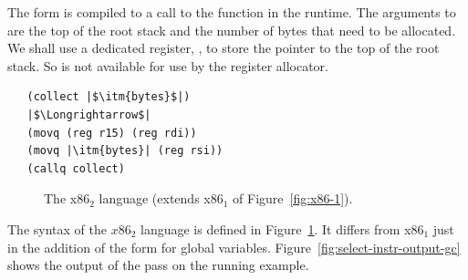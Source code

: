 \documentclass[11pt]{book}
\newcommand{\gray}[1]{{\color{gray} #1}}
\begin{document}
The  form is compiled to a call to the 
function in the runtime. The arguments to  are the top
of the root stack and the number of bytes that need to be allocated.
We shall use a dedicated register, , to store the pointer to
the top of the root stack. So  is not available for use by
the register allocator.
\begin{lstlisting}
   (collect |$\itm{bytes}$|)
   |$\Longrightarrow$|
   (movq (reg r15) (reg rdi))
   (movq |\itm{bytes}| (reg rsi))
   (callq collect)
\end{lstlisting}


\begin{figure}[tp]
\fbox{
\begin{minipage}{0.96\textwidth}
\[
\begin{array}{lcl}
\Arg &::=&  \gray{  \INT{\Int} \mid \REG{\Reg}
    \mid (\key{deref}\,\Reg\,\Int) } \\
   &\mid& \gray{ (\key{byte-reg}\; \Reg)  }
   \mid (\key{global-value}\; \itm{name}) \\
\itm{cc} & ::= & \gray{  \key{e} \mid \key{l} \mid \key{le} \mid \key{g} \mid \key{ge}  } \\
\Instr &::=& \gray{(\key{addq} \; \Arg\; \Arg) \mid
             (\key{subq} \; \Arg\; \Arg) \mid
             (\key{negq} \; \Arg) \mid (\key{movq} \; \Arg\; \Arg)} \\
      &\mid& \gray{(\key{callq} \; \mathit{label}) \mid
             (\key{pushq}\;\Arg) \mid
             (\key{popq}\;\Arg) \mid
             (\key{retq})} \\
       &\mid& \gray{  (\key{xorq} \; \Arg\;\Arg)
       \mid (\key{cmpq} \; \Arg\; \Arg) \mid (\key{set}\itm{cc} \; \Arg)  } \\
       &\mid& \gray{  (\key{movzbq}\;\Arg\;\Arg)
       \mid  (\key{jmp} \; \itm{label})
       \mid (\key{jmp-if}\itm{cc} \; \itm{label})}\\
       &\mid& \gray{(\key{label} \; \itm{label})  } \\
x86_2 &::= & \gray{  (\key{program} \;\itm{info} \;(\key{type}\;\itm{type})\; \Instr^{+})  }
\end{array}
\]
\end{minipage}
}
\caption{The x86$_2$ language (extends x86$_1$ of Figure~\ref{fig:x86-1}).}
\label{fig:x86-2}
\end{figure}

The syntax of the $x86_2$ language is defined in
Figure~\ref{fig:x86-2}.  It differs from x86$_1$ just in the addition
of the form for global variables.
%
Figure~\ref{fig:select-instr-output-gc} shows the output of the
 pass on the running example.
\end{document}
